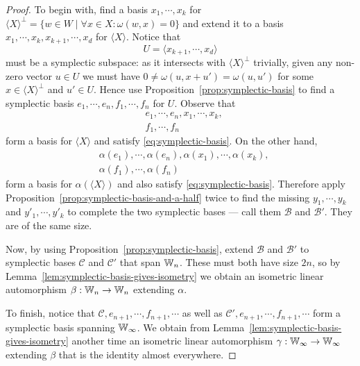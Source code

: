 \color{gray}
\begin{proof}
    To begin with, find a basis $x_1, \cdots, x_k$ for $\langle X \rangle^\perp = \{ w \in W \mid \forall x \in X : \omega(w, x) = 0 \}$ 
    and extend it to a basis \(
        x_1, \cdots, x_k, x_{k+1}, \cdots, x_d
    \) for $\langle X \rangle$.
    Notice that
    \[
        U = \langle x_{k+1}, \cdots, x_d \rangle
    \] must be a symplectic subspace:
    as it intersects with $\langle X \rangle^\perp$ trivially, 
    given any non-zero vector $u \in U$ we must have $0 \neq \omega(u, x + u') = \omega(u, u')$ for some $x \in \langle X \rangle^\perp$ and $u' \in U$.
    Hence use Proposition~\ref{prop:symplectic-basis} to find a symplectic basis
    \(
        e_1, \cdots, e_n,
        f_1, \cdots, f_n
    \)
    for $U$.
    Observe that 
    \begin{align*}
        &e_1, \cdots, e_n, x_1, \cdots, x_k, \\
        &f_1, \cdots, f_n
    \end{align*}
    form a basis for $\langle X \rangle$ and satisfy \eqref{eq:symplectic-basis}.
    On the other hand,
    \begin{align*}
        &\alpha(e_1), \cdots, \alpha(e_n), \alpha(x_1), \cdots, \alpha(x_k), \\
        &\alpha(f_1), \cdots, \alpha(f_n)
    \end{align*}
    form a basis for $\alpha(\langle X \rangle)$ and also satisfy \eqref{eq:symplectic-basis}.
    Therefore apply Proposition~\ref{prop:symplectic-basis-and-a-half} twice to find the missing 
    $y_1, \cdots, y_k$ and $y'_1, \cdots, y'_k$ to complete the two symplectic bases --- call them $\mathcal{B}$ and $\mathcal{B}'$.
    They are of the same size.

    Now, by using Proposition~\ref{prop:symplectic-basis}, extend $\mathcal{B}$ and $\mathcal{B}'$ to symplectic bases $\mathcal{C}$ and $\mathcal{C}'$ that span $\mathbb{W}_n$.
    These must both have size $2n$, 
    so by Lemma~\ref{lem:symplectic-basis-gives-isometry} we obtain an isometric linear automorphism $\beta : \mathbb{W}_n \to \mathbb{W}_n$ extending $\alpha$.

    To finish, notice that $\mathcal{C}, e_{n+1}, \cdots, f_{n+1}, \cdots$ as well as $\mathcal{C}', e_{n+1}, \cdots, f_{n+1}, \cdots$ 
    form a symplectic basis spanning $\mathbb{W}_\infty$.
    We obtain from Lemma~\ref{lem:symplectic-basis-gives-isometry} another time an isometric linear automorphism $\gamma : \mathbb{W}_\infty \to \mathbb{W}_\infty$ extending $\beta$ 
    that is the identity almost everywhere.
\end{proof}
\color{black}


